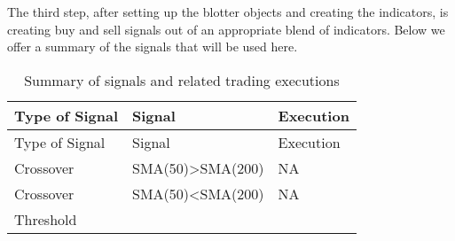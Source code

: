 \documentclass[
  11pt,
]{article}
\begin{document}
The third step, after setting up the blotter objects and creating the
indicators, is creating buy and sell signals out of an appropriate blend
of indicators. Below we offer a summary of the signals that will be used
here.

\begin{longtable}[]{@{}lll@{}}
\caption{Summary of signals and related trading
executions}\tabularnewline
\toprule
\begin{minipage}[b]{0.30\columnwidth}\raggedright
Type of Signal\strut
\end{minipage} & \begin{minipage}[b]{0.42\columnwidth}\raggedright
Signal\strut
\end{minipage} & \begin{minipage}[b]{0.15\columnwidth}\raggedright
Execution\strut
\end{minipage}\tabularnewline
\midrule
\endfirsthead
\toprule
\begin{minipage}[b]{0.30\columnwidth}\raggedright
Type of Signal\strut
\end{minipage} & \begin{minipage}[b]{0.42\columnwidth}\raggedright
Signal\strut
\end{minipage} & \begin{minipage}[b]{0.15\columnwidth}\raggedright
Execution\strut
\end{minipage}\tabularnewline
\midrule
\endhead
\begin{minipage}[t]{0.30\columnwidth}\raggedright
Crossover\strut
\end{minipage} & \begin{minipage}[t]{0.42\columnwidth}\raggedright
SMA(50)\textgreater SMA(200)\strut
\end{minipage} & \begin{minipage}[t]{0.15\columnwidth}\raggedright
NA\strut
\end{minipage}\tabularnewline
\begin{minipage}[t]{0.30\columnwidth}\raggedright
Crossover\strut
\end{minipage} & \begin{minipage}[t]{0.42\columnwidth}\raggedright
SMA(50)\textless SMA(200)\strut
\end{minipage} & \begin{minipage}[t]{0.15\columnwidth}\raggedright
NA\strut
\end{minipage}\tabularnewline
\begin{minipage}[t]{0.30\columnwidth}\raggedright
Threshold\strut

\end{minipage}
\end{longtable}
\end{document}
